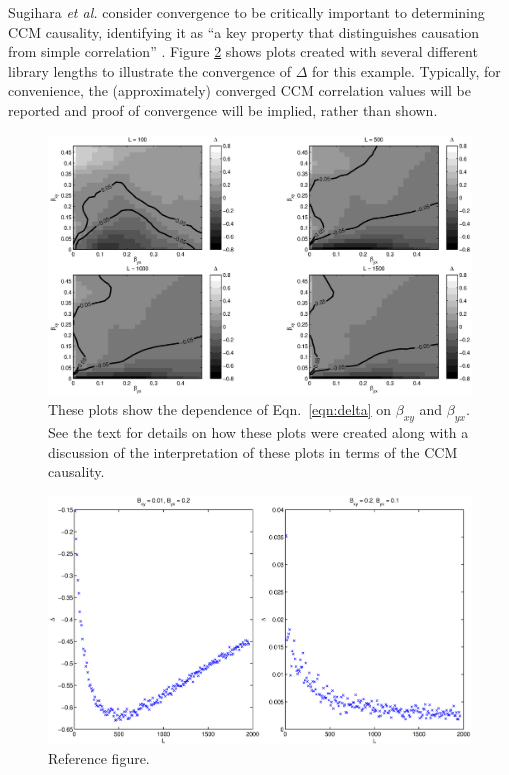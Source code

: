 \documentclass[a4paper,11pt]{article}
\begin{document}
Sugihara {\em et al. }consider convergence to be critically important to determining CCM causality, identifying it as ``a key property that distinguishes causation from simple correlation'' \cite{Sugihara2012}.  Figure \ref{fig:} shows plots created with several different library lengths to illustrate the convergence of $\Delta$ for this example.  Typically, for convenience, the (approximately) converged CCM correlation values will be reported and proof of convergence will be implied, rather than shown.
\begin{figure}[ht]
\label{fig:}
\includegraphics[scale=0.6]{Figure1.eps}
\caption{These plots show the dependence of Eqn.\ \ref{eqn:delta} on $\beta_{xy}$ and $\beta_{yx}$.  See the text for details on how these plots were created along with a discussion of the interpretation of these plots in terms of the CCM causality.}
\end{figure}
\begin{figure}[ht]
\label{fig:}
\includegraphics[scale=0.45]{RefFigure.eps}
\caption{Reference figure.}
\end{figure}
\end{document}
